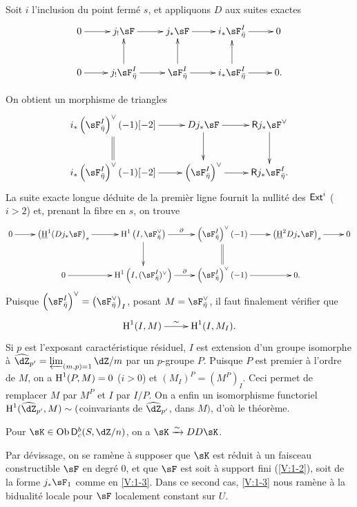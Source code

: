 Soit $i$ l'inclusion du point ferm\'e $s$, et appliquons $D$ aux suites 
exactes 
\[\xymatrix{
  0 \ar[r] 
    & j_! \sF \ar[r] 
    & j_\ast \sF \ar[r] 
    & i_\ast \sF_{\bar\eta}^I \ar[r] 
    & 0 \\
  0 \ar[r] 
    & j_! \sF_{\bar\eta}^I \ar[r] \ar[u] 
    & \sF_{\bar\eta}^I \ar[r] \ar[u] 
    & i_\ast \sF_{\bar\eta}^I \ar[r] \ar[u]
    & 0 \text{.}
}\]

On obtient un morphisme de triangles 
\[\xymatrix{
  i_\ast\left(\sF_{\bar\eta}^I\right)^\vee (-1)[-2] \ar[r] \ar@{=}[d] 
    & D j_\ast\sF \ar[r] \ar[d] 
    & \R j_\ast \sF^\vee \ar[d] \\
  i_\ast\left(\sF_{\bar\eta}^I\right)^\vee(-1)[-2] \ar[r] 
    & \left(\sF_{\bar\eta}^I\right)^\vee \ar[r] 
    & \R j_\ast \sF_{\bar\eta}^I \text{.}
}\]
La suite exacte longue d\'eduite de la premi\`er ligne fournit la nullit\'e des 
$\operatorname{\mathsf{Ext}}^i$ ($i>2$) et, prenant la fibre en $s$, on trouve 
\[\xymatrix{
  0 \ar[r] 
    & \left(\underline\h^1(D j_\ast\sF\right)_s \ar[r] 
    & \h^1\left(I,\sF_{\bar\eta}^\vee\right) \ar[r]^-\partial \ar[d] 
    & \left(\sF_{\bar\eta}^I\right)^\vee(-1) \ar[r] \ar@{=}[d] 
    & \left(\underline\h^2 D j_\ast\sF\right)_s \ar[r] 
    & 0 \\
  & 0 \ar[r] 
    & \h^1\left(I,(\sF_{\bar\eta}^I)^\vee\right) \ar[r]^-\partial 
    & \left(\sF_{\bar\eta}^I\right)^\vee(-1) \ar[r] 
    & 0 \text{.}
}\]
Puisque 
$\left(\sF_{\bar\eta}^I\right)^\vee = \left(\sF_{\bar\eta}^\vee\right)_I$, 
posant $M=\sF_{\bar\eta}^\vee$, il faut finalement v\'erifier que 
\[\xymatrix{
  \h^1(I,M) \ar[r]^-\sim 
    & \h^1(I,M_I) \text{.}
}\]
Si $p$ est l'exposant caract\'eristique r\'esiduel, $I$ est extension d'un 
groupe isomorphe \`a $\widehat\dZ_{p'} = \varprojlim_{(m,p)=1} \dZ/m$ par un 
$p$-groupe $P$. Puisque $P$ est premier \`a l'ordre de $M$, on a 
$\operatorname{H}^1(P,M)=0$ ($i>0$) et $(M_I)^P=(M^P)_I$. Ceci permet de remplacer $M$ par 
$M^P$ et $I$ par $I/P$. On a enfin un isomorphisme functoriel 
$\h^1(\widehat\dZ_{p'},M)\sim ($coinvariants de $\widehat\dZ_{p'}$, dans $M)$, 
d'o\`u le th\'eor\`eme. 





\begin{theorem_}\label{V:1-4}
Pour $\sK\in \ob\D_c^b(S,\dZ/n)$, on a $\sK\iso D D \sK$.
\end{theorem_}

Par d\'evissage, on se ram\`ene \`a supposer que $\sK$ est r\'eduit \`a un 
faisceau constructible $\sF$ en degr\'e $0$, et que $\sF$ est soit \`a support 
fini (\ref{V:1-2}), soit de la forme $j_\ast\sF_1$ comme en \ref{V:1-3}. Dans 
ce second cas, \ref{V:1-3} nous ram\`ene \`a la bidualit\'e locale pour $\sF$ 
localement constant sur $U$. 










